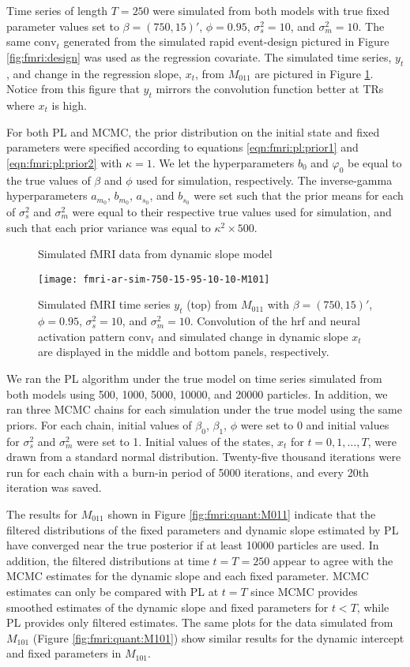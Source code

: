 Time series of length $T = 250$ were simulated from both models with true fixed parameter values set to $\beta = (750,15)'$, $\phi = 0.95$, $\sigma^2_s = 10$, and $\sigma^2_m = 10$. The same $\mbox{conv}_t$ generated from the simulated rapid event-design pictured in Figure \ref{fig:fmri:design} was used as the regression covariate. The simulated time series, $y_t$, and change in the regression slope, $x_t$, from $M_{011}$ are pictured in Figure \ref{fig:fmri:sim}. Notice from this figure that $y_t$ mirrors the convolution function better at TRs where $x_t$ is high.

For both PL and MCMC, the prior distribution on the initial state and fixed parameters were specified according to equations \eqref{eqn:fmri:pl:prior1} and \eqref{eqn:fmri:pl:prior2} with $\kappa = 1$. We let the hyperparameters $b_0$ and $\varphi_0$ be equal to the true values of $\beta$ and $\phi$ used for simulation, respectively. The inverse-gamma hyperparameters $a_{m_0}$, $b_{m_0}$, $a_{s_0}$, and $b_{s_0}$ were set such that the prior means for each of $\sigma^2_s$ and $\sigma^2_m$ were equal to their respective true values used for simulation, and such that each prior variance was equal to $\kappa^2\times500$.

\begin{figure}
\ssp
\centering
\caption{Simulated fMRI data from dynamic slope model} \label{fig:fmri:sim}
\texttt{[image: fmri-ar-sim-750-15-95-10-10-M101]}
\caption*{Simulated fMRI time series $y_t$ (top) from $M_{011}$ with $\beta = (750,15)'$, $\phi = 0.95$, $\sigma^2_s = 10$, and $\sigma^2_m = 10$. Convolution of the hrf and neural activation pattern $\mbox{conv}_t$ and simulated change in dynamic slope $x_t$ are displayed in the middle and bottom panels, respectively.}
\end{figure}

We ran the PL algorithm under the true model on time series simulated from both models using 500, 1000, 5000, 10000, and 20000 particles. In addition, we ran three MCMC chains for each simulation under the true model using the same priors. For each chain, initial values of $\beta_0$, $\beta_1$, $\phi$ were set to 0 and initial values for $\sigma^2_s$ and $\sigma^2_m$ were set to 1. Initial values of the states, $x_t$ for $t = 0,1,\ldots,T$, were drawn from a standard normal distribution. Twenty-five thousand iterations were run for each chain with a burn-in period of 5000 iterations, and every 20th iteration was saved.

The results for $M_{011}$ shown in Figure \ref{fig:fmri:quant:M011} indicate that the filtered distributions of the fixed parameters and dynamic slope estimated by PL have converged near the true posterior if at least 10000 particles are used. In addition, the filtered distributions at time $t = T = 250$ appear to agree with the MCMC estimates for the dynamic slope and each fixed parameter. MCMC estimates can only be compared with PL at $t = T$ since MCMC provides smoothed estimates of the dynamic slope and fixed parameters for $t < T$, while PL provides only filtered estimates. The same plots for the data simulated from $M_{101}$ (Figure \ref{fig:fmri:quant:M101}) show similar results for the dynamic intercept and fixed parameters in $M_{101}$.

